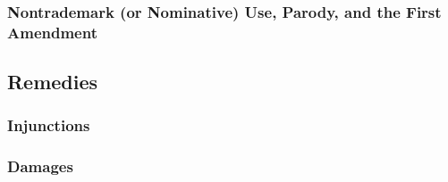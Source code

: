 
\subsubsection{Nontrademark (or Nominative) Use, Parody, and the First 
Amendment}


\subsection{Remedies}

\subsubsection{Injunctions}


\subsubsection{Damages}

